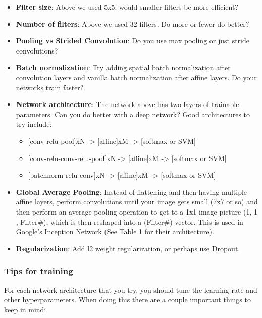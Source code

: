 \documentclass[11pt]{article}
\providecommand{\tightlist}{%
      \setlength{\itemsep}{0pt}\setlength{\parskip}{0pt}}
\begin{document}
\begin{itemize}
\tightlist
\item
  \textbf{Filter size}: Above we used 5x5; would smaller filters be more
  efficient?
\item
  \textbf{Number of filters}: Above we used 32 filters. Do more or fewer
  do better?
\item
  \textbf{Pooling vs Strided Convolution}: Do you use max pooling or
  just stride convolutions?
\item
  \textbf{Batch normalization}: Try adding spatial batch normalization
  after convolution layers and vanilla batch normalization after affine
  layers. Do your networks train faster?
\item
  \textbf{Network architecture}: The network above has two layers of
  trainable parameters. Can you do better with a deep network? Good
  architectures to try include:

  \begin{itemize}
  \tightlist
  \item
    {[}conv-relu-pool{]}xN -\textgreater{} {[}affine{]}xM
    -\textgreater{} {[}softmax or SVM{]}
  \item
    {[}conv-relu-conv-relu-pool{]}xN -\textgreater{} {[}affine{]}xM
    -\textgreater{} {[}softmax or SVM{]}
  \item
    {[}batchnorm-relu-conv{]}xN -\textgreater{} {[}affine{]}xM
    -\textgreater{} {[}softmax or SVM{]}
  \end{itemize}
\item
  \textbf{Global Average Pooling}: Instead of flattening and then having
  multiple affine layers, perform convolutions until your image gets
  small (7x7 or so) and then perform an average pooling operation to get
  to a 1x1 image picture (1, 1 , Filter\#), which is then reshaped into
  a (Filter\#) vector. This is used in
  \href{https://arxiv.org/abs/1512.00567}{Google's Inception Network}
  (See Table 1 for their architecture).
\item
  \textbf{Regularization}: Add l2 weight regularization, or perhaps use
  Dropout.
\end{itemize}

\subsubsection{Tips for training}\label{tips-for-training}

For each network architecture that you try, you should tune the learning
rate and other hyperparameters. When doing this there are a couple
important things to keep in mind:
\end{document}
